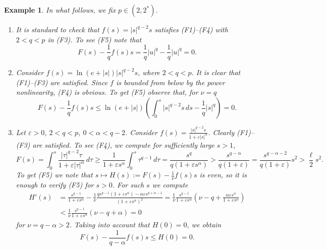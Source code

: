 \documentclass[12pt,leqno,twoside,sort]{amsart}
\newtheorem{Ex}[Th]{Example}
\numberwithin{equation}{section}
\begin{document}
\begin{Ex}
In what follows, we fix $p \in (2,2^*)$.
\begin{enumerate}
    \item[(a)] It is standard to check that $f(s)= |s|^{q-2}s$ satisfies (F1)--(F4) with $2 < q < p$ in (F3). To see (F5) note that
    $$
    F(s) - \frac{1}{q} f(s)s = \frac{1}{q} |u|^q - \frac1q |u|^q = 0. 
    $$
    \item[(b)] Consider $f(s) = \ln (e + |s|) |s|^{q-2}s$, where $2 < q < p$. It is clear that (F1)--(F3) are satisfied. Since $f$ is bounded from below by the power nonlinearity, (F4) is obvious. To get (F5) observe that, for $\nu=q$
    \[
    F(s)-\frac{1}q f(s)s\leq \ln(e+|s|)\left(\int_0^s |s|^{q-2}s\,ds-\frac1q |s|^q \right)=0.
    \]
   
    \item[(c)] Let $\varepsilon > 0$, $2 < q < p$, $0 < \alpha < q-2$. Consider $f(s) = \frac{|s|^{q-2}s}{1+\varepsilon |s|^\alpha}$. Clearly (F1)--(F3) are satisfied. To see (F4), we compute for sufficiently large $s > 1$,
    $$
    F(s) = \int_0^s \frac{|\tau|^{q-2} \tau}{1+\varepsilon |\tau|^\alpha} \, d\tau \geq \frac{1}{1+\varepsilon s^\alpha} \int_0^s \tau^{q-1} \,d\tau = \frac{s^q}{q (1+\varepsilon s^\alpha)} > \frac{s^{q-\alpha}}{q (1+\varepsilon )} = \frac{s^{q-\alpha-2}}{q (1+\varepsilon )} s^2 > \frac{\ell}{2} s^2.
    $$
    To get (F5) we note that $s \mapsto H(s) := F(s) - \frac{1}{\nu} f(s)s$ is even, so it is enough to verify (F5) for $s > 0$. For such $s$ we compute
    \begin{align*}
    H'(s) &= \frac{s^{q-1}}{1+\varepsilon s^\alpha} - \frac{1}{\nu} \frac{q s^{q-1} (1+\varepsilon s^\alpha) - \alpha \varepsilon s^{q+\alpha - 1}}{(1+\varepsilon s^\alpha)^2} = \frac{1}{\nu} \frac{s^{q-1}}{1+\varepsilon s^\alpha} \left( \nu - q + \frac{ \alpha \varepsilon s^\alpha }{1+\varepsilon s^\alpha} \right) \\
    &< \frac{1}{\nu} \frac{s^{q-1}}{1+\varepsilon s^\alpha} \left( \nu - q + \alpha \right) = 0
    \end{align*}
    for $\nu = q - \alpha > 2$. Taking into account that $H(0) = 0$, we obtain
    $$
    F(s) - \frac{1}{q-\alpha} f(s)s \leq H(0) = 0.
    $$
    

\end{enumerate}
\end{Ex}
\end{document}
